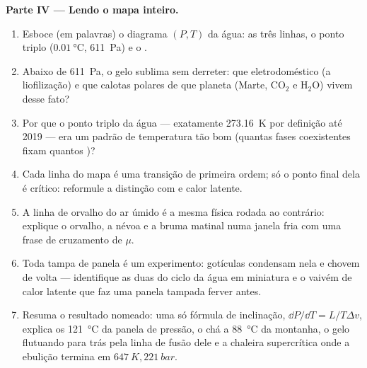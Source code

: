 \begin{problem}
\medskip\noindent\textbf{Parte IV --- Lendo o mapa inteiro.}
\begin{enumerate}[resume]
  \item Esboce (em palavras) o diagrama $(P, T)$ da água: as três
        linhas, o ponto triplo ($\qty{0.01}{\celsius}$,
        \qty{611}{Pa}) e o .
  \item Abaixo de \qty{611}{Pa}, o gelo sublima sem derreter: que
        eletrodoméstico (a liofilização) e que calotas polares de
        que planeta (Marte, CO$_2$ e H$_2$O) vivem desse fato?
  \item Por que o ponto triplo da água --- exatamente
        \qty{273.16}{K} por definição até 2019 --- era um padrão
        de temperatura tão bom (quantas fases coexistentes fixam
        quantos )?
  \item Cada linha do mapa é uma transição de primeira ordem; só
        o ponto final dela é crítico: reformule a distinção com
         e calor latente.
  \item A linha de orvalho do ar úmido é a mesma física rodada ao
        contrário: explique o orvalho, a névoa e a bruma matinal numa
        janela fria com uma frase de cruzamento de $\mu$.
  \item Toda tampa de panela é um experimento: gotículas condensam
        nela e chovem de volta --- identifique as duas  do ciclo da água em miniatura e o vaivém de calor latente
        que faz uma panela tampada ferver antes.
  \item Resuma o resultado nomeado: uma só fórmula de inclinação, $\dd P/
        \dd T = L/T\Delta v$, explica os \qty{121}{\celsius} da
        panela de pressão, o chá a \qty{88}{\celsius} da
        montanha, o gelo flutuando para trás pela linha de fusão dele e
        a chaleira supercrítica onde a ebulição termina em
        $\qty{647}{K}, \qty{221}{bar}$.
\end{enumerate}
\end{problem}

